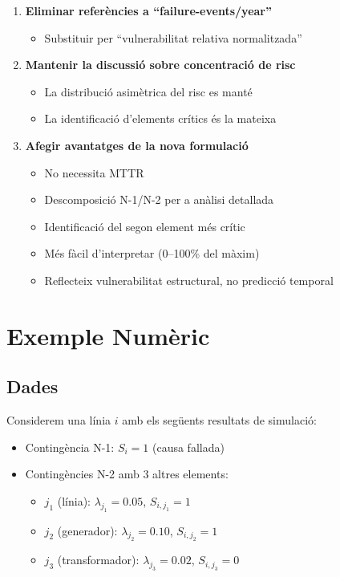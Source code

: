 \documentclass[11pt,a4paper]{article}
\begin{document}
\begin{enumerate}
    \item \textbf{Eliminar referències a ``failure-events/year''}
    \begin{itemize}
        \item Substituir per ``vulnerabilitat relativa normalitzada''
    \end{itemize}
    
    \item \textbf{Mantenir la discussió sobre concentració de risc}
    \begin{itemize}
        \item La distribució asimètrica del risc es manté
        \item La identificació d'elements crítics és la mateixa
    \end{itemize}
    
    \item \textbf{Afegir avantatges de la nova formulació}
    \begin{itemize}
        \item No necessita MTTR
        \item Descomposició N-1/N-2 per a anàlisi detallada
        \item Identificació del segon element més crític
        \item Més fàcil d'interpretar (0--100\% del màxim)
        \item Reflecteix vulnerabilitat estructural, no predicció temporal
    \end{itemize}
\end{enumerate}

\section{Exemple Numèric}

\subsection{Dades}

Considerem una línia $i$ amb els següents resultats de simulació:
\begin{itemize}
    \item Contingència N-1: $S_i = 1$ (causa fallada)
    \item Contingències N-2 amb 3 altres elements:
    \begin{itemize}
        \item $j_1$ (línia): $\lambda_{j_1} = 0.05$, $S_{i,j_1} = 1$
        \item $j_2$ (generador): $\lambda_{j_2} = 0.10$, $S_{i,j_2} = 1$
        \item $j_3$ (transformador): $\lambda_{j_3} = 0.02$, $S_{i,j_3} = 0$
    \end{itemize}
\end{itemize}
\end{document}
